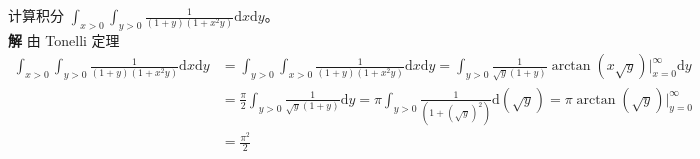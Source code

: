 \documentclass{ctexbook}
\newcommand{\no}{\noindent}
\newcommand{\EXP}{\no {\bf 例}\quad}
\begin{document}
\EXP 计算积分 $\int_{x>0}\int_{y>0}\frac {1}{(1+y)(1+x^2y)}\mathrm dx\mathrm dy$。\\

{\bf 解} 由 Tonelli 定理
\[
	\begin{aligned}
	\int_{x>0}\int_{y>0}\frac {1}{(1+y)(1+x^2y)}\mathrm dx\mathrm dy&=\int_{y>0}\int_{x>0}\frac {1}{(1+y)(1+x^2y)}\mathrm dx\mathrm dy=\int_{y>0} \frac {1}{\sqrt y(1+y)}\arctan {(x\sqrt y)}\lvert_{x=0}^{\infty}\mathrm dy\\
	&=\frac{\pi}{2}\int_{y>0} \frac {1}{\sqrt y(1+y)}\mathrm dy=\pi \int_{y>0} \frac {1}{(1+(\sqrt y)^2)}\mathrm d(\sqrt y)=\pi \arctan {(\sqrt y)}\lvert_{y=0}^{\infty}\\
	&=\frac{\pi^2}{2}
	\end{aligned}
\]
\end{document}
